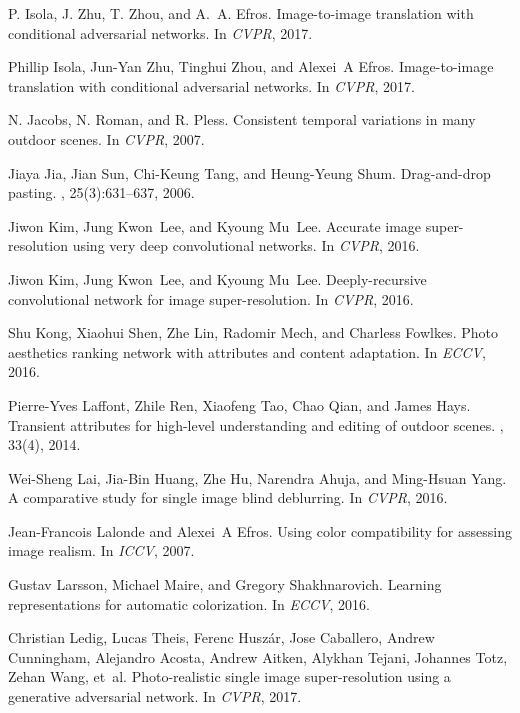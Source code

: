 \documentclass[10pt,twocolumn,letterpaper]{article}
\begin{document}
\begin{thebibliography}{10}
P. {Isola}, J. {Zhu}, T. {Zhou}, and A.~A. {Efros}.
\newblock Image-to-image translation with conditional adversarial networks.
\newblock In {\em CVPR}, 2017.

Phillip Isola, Jun-Yan Zhu, Tinghui Zhou, and Alexei~A Efros.
\newblock Image-to-image translation with conditional adversarial networks.
\newblock In {\em CVPR}, 2017.

N. {Jacobs}, N. {Roman}, and R. {Pless}.
\newblock Consistent temporal variations in many outdoor scenes.
\newblock In {\em CVPR}, 2007.

Jiaya Jia, Jian Sun, Chi-Keung Tang, and Heung-Yeung Shum.
\newblock Drag-and-drop pasting.
, 25(3):631--637, 2006.

Jiwon Kim, Jung Kwon~Lee, and Kyoung Mu~Lee.
\newblock Accurate image super-resolution using very deep convolutional
  networks.
\newblock In {\em CVPR}, 2016.

Jiwon Kim, Jung Kwon~Lee, and Kyoung Mu~Lee.
\newblock Deeply-recursive convolutional network for image super-resolution.
\newblock In {\em CVPR}, 2016.

Shu Kong, Xiaohui Shen, Zhe Lin, Radomir Mech, and Charless Fowlkes.
\newblock Photo aesthetics ranking network with attributes and content
  adaptation.
\newblock In {\em ECCV}, 2016.

Pierre-Yves Laffont, Zhile Ren, Xiaofeng Tao, Chao Qian, and James Hays.
\newblock Transient attributes for high-level understanding and editing of
  outdoor scenes.
, 33(4), 2014.

Wei-Sheng Lai, Jia-Bin Huang, Zhe Hu, Narendra Ahuja, and Ming-Hsuan Yang.
\newblock A comparative study for single image blind deblurring.
\newblock In {\em CVPR}, 2016.

Jean-Francois Lalonde and Alexei~A Efros.
\newblock Using color compatibility for assessing image realism.
\newblock In {\em ICCV}, 2007.

Gustav Larsson, Michael Maire, and Gregory Shakhnarovich.
\newblock Learning representations for automatic colorization.
\newblock In {\em ECCV}, 2016.

Christian Ledig, Lucas Theis, Ferenc Husz{\'a}r, Jose Caballero, Andrew
  Cunningham, Alejandro Acosta, Andrew Aitken, Alykhan Tejani, Johannes Totz,
  Zehan Wang, et~al.
\newblock Photo-realistic single image super-resolution using a generative
  adversarial network.
\newblock In {\em CVPR}, 2017.


\end{thebibliography}
\end{document}
